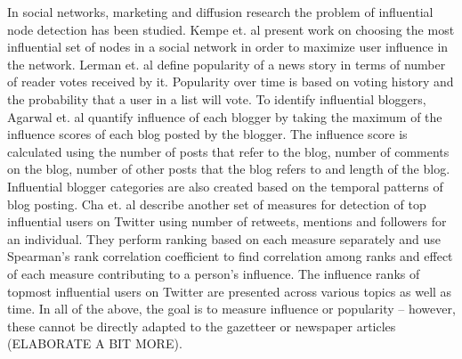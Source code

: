 \documentclass[a4paper,man,natbib]{apa6}
\begin{document}
In social networks, marketing and diffusion research the problem of influential node detection has been studied.
Kempe et. al \cite{kempe2003maximizing} present work on choosing the most influential set of nodes in a social network in order to maximize user influence in the network. 
Lerman et. al \cite{lerman2010using} define popularity of a news story in terms of number of reader votes received by it. Popularity over time is based on voting history and the probability that a user in a list will vote. To identify influential bloggers, Agarwal et. al\cite{agarwal2008identifying} quantify influence of each blogger by taking the maximum of the influence scores of each blog posted by the blogger. The influence score is calculated using the number of posts that refer to the blog, number of comments on the blog, number of other posts that the blog refers to and length of the blog. Influential blogger categories are also created based on the temporal patterns of blog posting. Cha et. al\cite{cha2010measuring} describe another set of measures for detection of top influential users on Twitter using number of retweets, mentions and followers for an individual. They perform ranking based on each measure separately and use Spearman's rank correlation coefficient to find correlation among ranks and effect of each measure contributing to a person's influence. The influence ranks of topmost influential users on Twitter are presented across various topics as well as time. In all of the above, the goal is to measure influence or popularity -- however, these cannot be directly adapted to the gazetteer or newspaper articles (ELABORATE A BIT MORE). 

\end{document}
